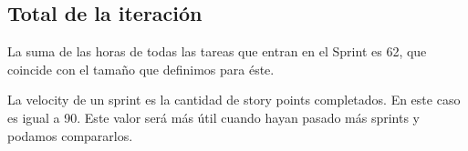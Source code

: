 \subsection{Total de la iteración}

La suma de las horas de todas las tareas que entran en el Sprint es 62, que coincide con el tamaño que definimos para éste.

La velocity de un sprint es la cantidad de story points completados. En este caso es igual a 90. Este valor será más útil cuando hayan pasado más sprints y podamos compararlos.